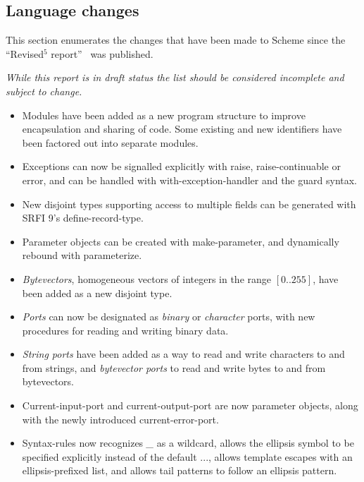 

\subsection*{Language changes}
\label{differences}

This section enumerates the changes that have been made to Scheme since
the ``Revised$^5$ report''~\cite{R5RS} was published.

{\em While this report is in draft status the list should be considered incomplete and subject to change.}

\begin{itemize}

\item Modules have been added as a new program structure to improve
encapsulation and sharing of code.  Some existing and new identifiers
have been factored out into separate modules.

\item Exceptions can now be signalled explicitly with {\cf raise},
{\cf raise-continuable} or {\cf error}, and can be handled with {\cf
with-exception-handler} and the {\cf guard} syntax.

\item New disjoint types supporting access to multiple fields can be
generated with SRFI 9's {\cf define-record-type}.

\item Parameter objects can be created with {\cf make-parameter}, and
dynamically rebound with {\cf parameterize}.

\item {\em Bytevectors}, homogeneous vectors of integers in the range
$[0..255]$, have been added as a new disjoint type.

\item {\em Ports} can now be designated as {\em binary} or {\em
character} ports, with new procedures for reading and writing binary
data.

\item {\em String ports} have been added as a way to read and write
characters to and from strings, and {\em bytevector ports} to read
and write bytes to and from bytevectors.

\item {\cf Current-input-port} and {\cf current-output-port} are now
parameter objects, along with the newly introduced {\cf
current-error-port}.

\item {\cf Syntax-rules} now recognizes {\em \_} as a wildcard, allows
the ellipsis symbol to be specified explicitly instead of the default
{\cf ...}, allows template escapes with an ellipsis-prefixed list, and
allows tail patterns to follow an ellipsis pattern.


\end{itemize}
